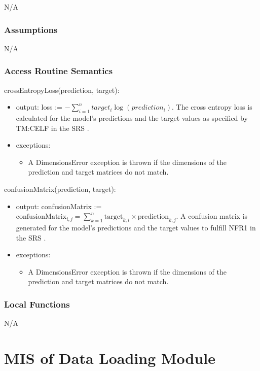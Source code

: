 \documentclass[12pt, titlepage]{article}
\begin{document}
N/A

\subsubsection{Assumptions}

N/A

\subsubsection{Access Routine Semantics}

\noindent crossEntropyLoss(prediction, target):
\begin{itemize}
\item output: loss := $- \sum_{i=1}^{n} target_i \log(prediction_i)$. The cross
entropy loss is calculated for the model's predictions and the target values
as specified by TM:CELF in the SRS \cite[4.2.2]{SRS}.
\item exceptions:
\begin{itemize}
  \item A DimensionsError exception is thrown if the dimensions of the prediction
  and target matrices do not match.
\end{itemize}
\end{itemize}

\noindent confusionMatrix(prediction, target):
\begin{itemize}
\item output: confusionMatrix := $\text{confusionMatrix}_{i,j} = \sum_{k=1}^{n} \text{target}_{k,i} \times \text{prediction}_{k,j}$. A confusion matrix is generated for the
model's predictions and the target values to fulfill NFR1 in the SRS
\cite[5.2]{SRS}.
\item exceptions:
\begin{itemize}
  \item A DimensionsError exception is thrown if the dimensions of the prediction
  and target matrices do not match.
\end{itemize}
\end{itemize}

\subsubsection{Local Functions}

N/A

\newpage
\section{MIS of Data Loading Module} \label{MDataLoading}
\end{document}

